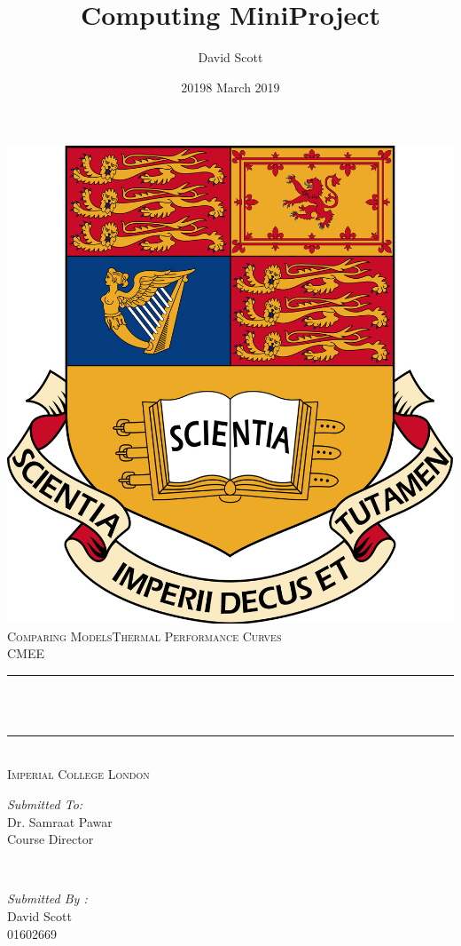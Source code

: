 \documentclass[11pt]{article}
\date{2019}
\title{Computing MiniProject}	%
\author{David Scott}			%
\date{8 March 2019}			    %
\makeatletter
\let\thetitle\@title
\makeatother
\begin{document}
	\begin{titlepage}
		\centering
		\vspace*{0.5 cm}
		\includegraphics[scale = 0.15]{logo2.png}\\[1.0 cm]	%
		\textsc{\LARGE Comparing Models\newline\newline Thermal Performance Curves}\\[2.0 cm]	%
		\textsc{\Large CMEE}\\[0.5 cm]				%
		\rule{\linewidth}{0.2 mm} \\[0.4 cm]
		{ \huge \bfseries \thetitle}\\
		\rule{\linewidth}{0.2 mm} \\[1.5 cm]
		\textsc{\Large Imperial College London}\\[0.5 cm]	
		\vspace*{3 cm}
		\begin{minipage}{0.4\textwidth}
			\begin{flushleft} \large
				\emph{Submitted To:}\\
				Dr. Samraat Pawar\\
				Course Director\\
			\end{flushleft}
		\end{minipage}~
		\begin{minipage}{0.4\textwidth}
			
			\begin{flushright} \large
				\emph{Submitted By :} \\
				David Scott\\
				01602669\\
			\end{flushright}
			
		\end{minipage}\\[2 cm]
		
	\end{titlepage}
\end{document}
